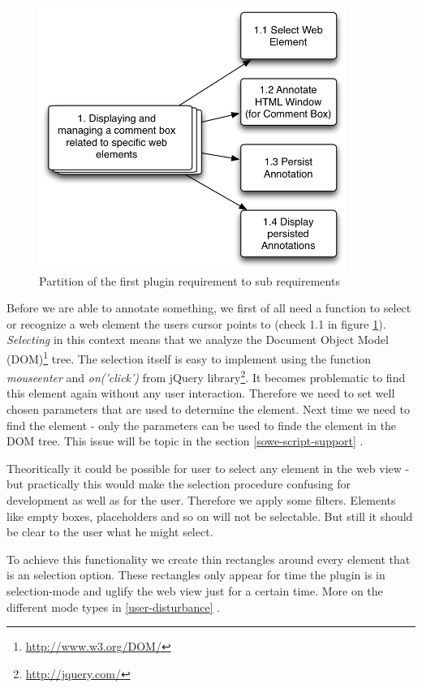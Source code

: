 \begin{figure}\centering
		\includegraphics[width=10cm]{images/abstract2concrete-1.png}
		\caption{Partition of the first plugin requirement to sub requirements}
		\label{abstract2concrete-1}
\end{figure} 

Before we are able to annotate something, we first of all need a function to select or recognize a web element the users cursor points to (check 1.1 in figure \ref{abstract2concrete-1}). \emph{Selecting} in this context means that we analyze the Document Object Model (DOM)\footnote{\url{http://www.w3.org/DOM/}} tree. The selection itself is easy to implement using the function \emph{mouseenter} and \emph{on('click')} from jQuery library\footnote{\url{http://jquery.com/}}. It becomes problematic to find this element again without any user interaction. Therefore we need to set well chosen parameters that are used to determine the element. Next time we need to find the element - only the parameters can be used to finde the element in the DOM tree. This issue will be topic in the section \ref{sowe-script-support} .

Theoritically it could be possible for user to select any element in the web view - but practically this would make the selection procedure confusing for development as well as for the user. Therefore we apply some filters. Elements like empty boxes, placeholders and so on will not be selectable. 
But still it should be clear to the user what he might select. 

To achieve this functionality we create thin rectangles around every element that is an selection option. These rectangles only appear for time the plugin is in selection-mode and uglify the web view just for a certain time. More on the different mode types in \ref{user-disturbance}  .

